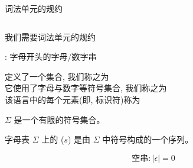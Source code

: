 
\begin{frame}{}
  \begin{center}
    词法单元的规约

    \vspace{0.40cm}
    \begin{columns}
    \end{columns}

    \vspace{0.60cm}
    我们需要词法单元的规约
  \end{center}
\end{frame}

\begin{frame}{}
  \begin{center}
    \id: 字母开头的字母/数字串

    \vspace{0.80cm}
    \id{} 定义了一个集合, 我们称之为 \\[15pt]
    它使用了字母与数字等符号集合, 我们称之为 \\[15pt]
    该语言中的每个元素(即, 标识符)称为
  \end{center}
\end{frame}

\begin{frame}{}
  \begin{definition}[字母表]
     $\Sigma$ 是一个有限的符号集合。
  \end{definition}

\end{frame}

\begin{frame}{}
  \begin{definition}[串]
    字母表 $\Sigma$ 上的 ($s$) 是由 $\Sigma$ 中符号构成的一个序列。
  \end{definition}

  \vspace{-0.30cm}
  \[
    \text{空串}: |\epsilon| = 0
  \]
\end{frame}

